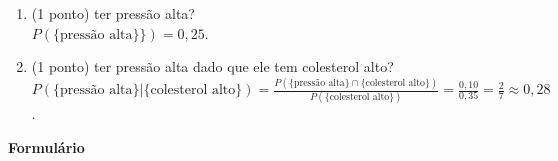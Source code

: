 \documentclass{article}
\begin{document}
\begin{enumerate}
\begin{enumerate}
	\item (1 ponto) ter pressão alta?\\{
	\color{blue}
	$P(\{\text{pressão alta}\} \}) = 0,25$.	
	}
	
	\item (1 ponto) ter pressão alta dado que ele tem colesterol alto?\\{
	\color{blue}
	$P(\{\text{pressão alta}\} | \{\text{colesterol alto}\}) = \frac{ P(\{\text{pressão alta}\} \cap \{\text{colesterol alto}\}) }{P( \{\text{colesterol alto}\} )} = \frac{0,10}{0,35} = \frac{2}{7} \approx 0,28$.	
	}
	
\end{enumerate}

\end{enumerate}



\vspace{2cm}

\begin{center}
	\Large{\textbf{Formulário}}
\end{center}
\end{document}
